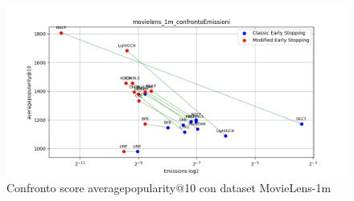 \begin{figure}[H]
    \centering
    \includegraphics[width=\linewidth, trim=0 0 0 0]{images/averagepopularity@10_movielens_1m_comparison.png}
    \caption{Confronto score averagepopularity@10 con dataset MovieLens-1m}
\end{figure}




